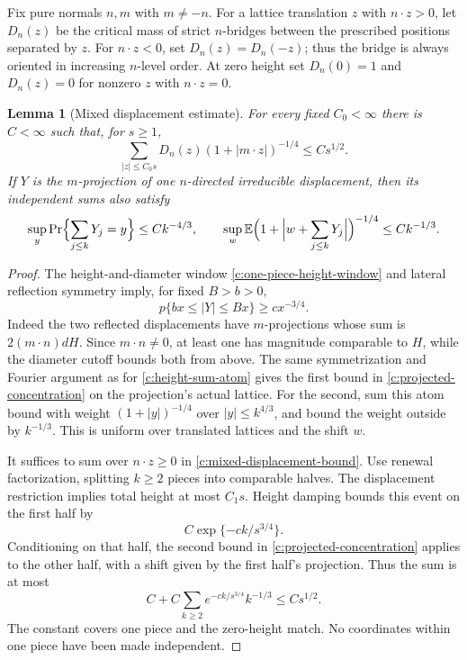 \documentclass[11pt]{article}
\numberwithin{equation}{section}
\newtheorem{lemma}[theorem]{Lemma}
\theoremstyle{definition}\newtheorem{definition}[theorem]{Definition}
\theoremstyle{remark}\newtheorem{remark}[theorem]{Remark}
\begin{document}
Fix pure normals $n,m$ with $m\ne-n$. For a lattice translation $z$
with $n\cdot z>0$, let $D_n(z)$ be the critical mass of strict
$n$-bridges between the prescribed positions separated by $z$.
For $n\cdot z<0$, set $D_n(z)=D_n(-z)$; thus the bridge is always
oriented in increasing $n$-level order. At zero height set
$D_n(0)=1$ and $D_n(z)=0$ for nonzero $z$ with $n\cdot z=0$.

\begin{lemma}[Mixed displacement estimate]\label{c:mixed-displacement}
For every fixed $C_0<\infty$ there is $C<\infty$ such that, for $s\ge1$,
\begin{equation}\label{c:mixed-displacement-bound}
 \sum_{|z|\le C_0s}D_n(z)(1+|m\cdot z|)^{-1/4}\le Cs^{1/2}.
\end{equation}
If $Y$ is the $m$-projection of one $n$-directed irreducible displacement,
then its independent sums also satisfy
\begin{equation}\label{c:projected-concentration}
 \sup_y\Pr\Bigl\{\sum_{j\le k}Y_j=y\Bigr\}\le Ck^{-4/3},
 \qquad
 \sup_w\mathbb E\Bigl(1+\Bigl|w+\sum_{j\le k}Y_j\Bigr|\Bigr)^{-1/4}
 \le Ck^{-1/3}.
\end{equation}
\end{lemma}
\begin{proof}
The height-and-diameter window \eqref{c:one-piece-height-window} and
lateral reflection symmetry imply, for fixed $B>b>0$,
\[
 p\{bx\le |Y|\le Bx\}\ge cx^{-3/4}.
\]
Indeed the two reflected displacements have $m$-projections whose sum
is $2(m\cdot n)dH$. Since $m\cdot n\ne0$, at least one has magnitude
comparable to $H$, while the diameter cutoff bounds both from above.
The same symmetrization and Fourier argument as for
\eqref{c:height-sum-atom} gives the first bound in
\eqref{c:projected-concentration} on the projection's actual lattice.
For the second, sum this atom bound with weight $(1+|y|)^{-1/4}$
over $|y|\le k^{4/3}$, and bound the weight outside by $k^{-1/3}$.
This is uniform over translated lattices and the shift $w$.

It suffices to sum over $n\cdot z\ge0$ in
\eqref{c:mixed-displacement-bound}. Use renewal factorization, splitting
$k\ge2$ pieces into comparable halves. The displacement restriction
implies total height at most $C_1s$. Height damping bounds this event
on the first half by
\[
 C\exp\{-ck/s^{3/4}\}.
\]
Conditioning on that half, the second bound in
\eqref{c:projected-concentration} applies to the other half, with a
shift given by the first half's projection. Thus the sum is at most
\[
 C+C\sum_{k\ge2}e^{-ck/s^{3/4}}k^{-1/3}\le Cs^{1/2}.
\]
The constant covers one piece and the zero-height match. No coordinates
within one piece have been made independent.
\end{proof}
\end{document}

